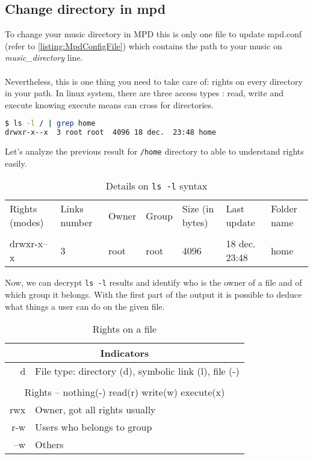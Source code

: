 \subsection{Change directory in mpd}
To change your music directory in MPD this is only one file to update 
mpd.conf (refer to \ref{listing:MpdConfigFile}) which contains the path to your 
music on \emph{music\_directory} line.
\\\\
Nevertheless, this is one thing you need to take care of: rights on every directory 
in your path. In linux system, there are three access types : read, write and 
execute knowing execute means \og{}can cross\fg{} for directories.

\begin{lstlisting}[language=bash,caption=Analyze rights on home]
$ ls -l / | grep home
drwxr-x--x  3 root root  4096 18 dec.  23:48 home
\end{lstlisting}

Let's analyze the previous result for \texttt{/home} directory to 
able to understand rights easily.

\begin{table}[h]
\centering
	\begin{tabu}{p{2cm}|p{40px}|l|l|p{40px}|l|p{2cm}}
		\rowfont{\bfseries\footnotesize}
		Rights (modes) & Links number & Owner & Group & Size (in bytes) & Last update   & Folder name\\
		&&&&&&\\
		\rowfont{\ttfamily\small}
		drwxr-x--x     & 3            & root  & root  & 4096            & 18 dec. 23:48 & home\\
	\end{tabu}
	\caption{Details on \texttt{ls -l} syntax}
\end{table}

Now, we can decrypt \texttt{ls -l} results and identify who is the owner of a 
file and of which group it belongs. With the first part of the output it is 
possible to deduce what things a user can do on the given file.

\begin{table}[h]
\centering
	\begin{tabular}{rl}
		\hline
		\multicolumn{2}{|c|}{Indicators}\\
		\hline
		d   & File type: directory (d), symbolic link (l), file (-)\\
		&\\
		\hline
		\multicolumn{2}{|c|}{Rights -- nothing(-) read(r) write(w) execute(x)}\\
		\hline
		rwx & Owner, got all rights usually\\ 
		r-w & Users who belongs to group\\ 
		--w & Others\\ 		
	\end{tabular}
	\caption{Rights on a file}
\end{table}

